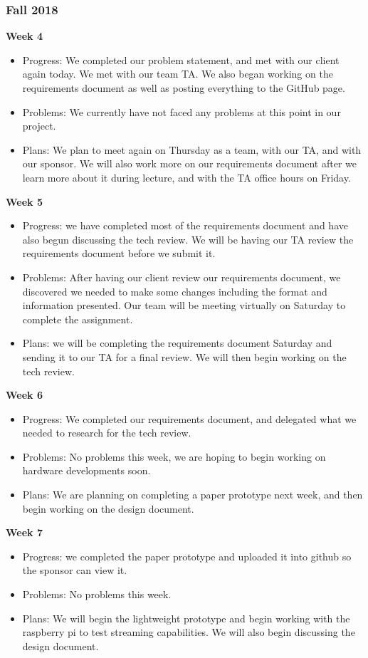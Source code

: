 \documentclass[onecolumn, draftclsnofoot,10pt, compsoc]{IEEEtran}
\begin{document}
\subsubsection{Fall 2018}
\textbf{Week 4}
\begin{itemize}
    \item Progress: We completed our problem statement, and met with our client again today. We met with our team TA. We also began working on the requirements document as well as posting everything to the GitHub page.
    \item Problems: We currently have not faced any problems at this point in our project.
    \item Plans: We plan to meet again on Thursday as a team, with our TA, and with our sponsor. We will also work more on our requirements document after we learn more about it during lecture, and with the TA office hours on Friday. 
\end{itemize}
\textbf{Week 5}
\begin{itemize}
    \item Progress: we have completed most of the requirements document and have also begun discussing the tech review. We will be having our TA review the requirements document before we submit it.
    \item Problems: After having our client review our requirements document, we discovered we needed to make some changes including the format and information presented. Our team will be meeting virtually on Saturday to complete the assignment.
    \item Plans: we will be completing the requirements document Saturday and sending it to our TA for a final review. We will then begin working on the tech review.
\end{itemize}
\textbf{Week 6}
\begin{itemize}
    \item Progress: We completed our requirements document, and delegated what we needed to research for the tech review.
    \item Problems: No problems this week, we are hoping to begin working on hardware developments soon.
    \item Plans: We are planning on completing a paper prototype next week, and then begin working on the design document.
\end{itemize}
\textbf{Week 7}
\begin{itemize}
    \item Progress: we completed the paper prototype and uploaded it into github so the sponsor can view it.
    \item Problems: No problems this week.
    \item Plans: We will begin the lightweight prototype and begin working with the raspberry pi to test streaming capabilities. We will also begin discussing the design document.
\end{itemize}
\end{document}
